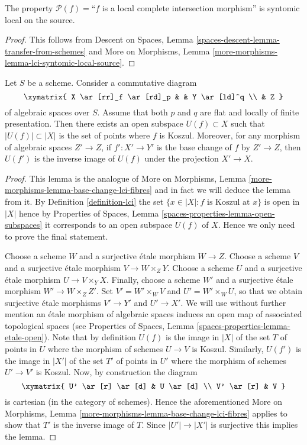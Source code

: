 \begin{lemma}
\label{lemma-lci-syntomic-local-source}
The property $\mathcal{P}(f) =$``$f$ is a local complete intersection
morphism'' is syntomic local on the source.
\end{lemma}

\begin{proof}
This follows from
Descent on Spaces, Lemma \ref{spaces-descent-lemma-transfer-from-schemes} and
More on Morphisms, Lemma \ref{more-morphisms-lemma-lci-syntomic-local-source}.
\end{proof}

\begin{lemma}
\label{lemma-base-change-lci-fibres}
Let $S$ be a scheme. Consider a commutative diagram
$$
\xymatrix{
X \ar[rr]_f \ar[rd]_p & & Y \ar[ld]^q \\
& Z
}
$$
of algebraic spaces over $S$. Assume that both $p$ and $q$
are flat and locally of finite presentation.
Then there exists an open subspace $U(f) \subset X$
such that $|U(f)| \subset |X|$ is the set of points where $f$ is Koszul.
Moreover, for any morphism of algebraic spaces $Z' \to Z$, if
$f' : X' \to Y'$ is the base change of $f$ by $Z' \to Z$, then
$U(f')$ is the inverse image of $U(f)$ under the projection $X' \to X$.
\end{lemma}

\begin{proof}
This lemma is the analogue of
More on Morphisms, Lemma \ref{more-morphisms-lemma-base-change-lci-fibres}
and in fact we will deduce the lemma from it. By
Definition \ref{definition-lci}
the set $\{x \in |X| : f \text{ is Koszul at }x\}$ is
open in $|X|$ hence by
Properties of Spaces, Lemma \ref{spaces-properties-lemma-open-subspaces}
it corresponds to an open subspace $U(f)$ of $X$. Hence we only need to
prove the final statement.

\medskip\noindent
Choose a scheme $W$ and a surjective \'etale morphism $W \to Z$.
Choose a scheme $V$ and a surjective \'etale morphism $V \to W \times_Z Y$.
Choose a scheme $U$ and a surjective \'etale morphism $U \to V \times_Y X$.
Finally, choose a scheme $W'$ and a surjective \'etale morphism
$W' \to W \times_Z Z'$.
Set $V' = W' \times_W V$ and $U' = W' \times_W U$, so that we obtain
surjective \'etale morphisms $V' \to Y'$ and $U' \to X'$.
We will use without further mention an \'etale morphism of algebraic spaces
induces an open map of associated topological spaces (see
Properties of Spaces, Lemma
\ref{spaces-properties-lemma-etale-open}).
Note that by definition $U(f)$ is the image in $|X|$ of the set $T$
of points in $U$ where the morphism of schemes $U \to V$ is Koszul.
Similarly, $U(f')$ is the image in $|X'|$ of the set $T'$ of points in
$U'$ where the morphism of schemes $U' \to V'$ is Koszul. Now, by construction
the diagram
$$
\xymatrix{
U' \ar[r] \ar[d] & U \ar[d] \\
V' \ar[r] & V
}
$$
is cartesian (in the category of schemes). Hence the aforementioned
More on Morphisms, Lemma \ref{more-morphisms-lemma-base-change-lci-fibres}
applies to show that $T'$ is the inverse image of $T$. Since
$|U'| \to |X'|$ is surjective this implies the lemma.
\end{proof}

